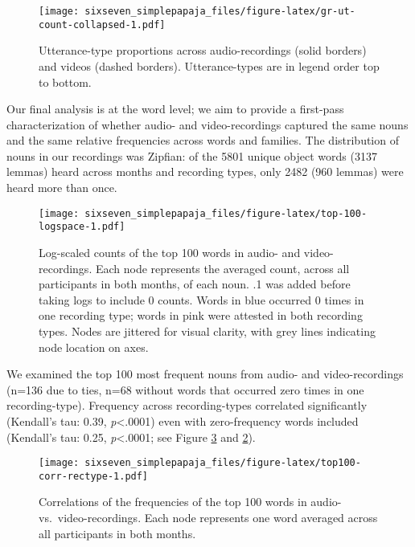 \documentclass[floatsintext,man]{apa6}
\theoremstyle{definition}
\theoremstyle{definition}
\theoremstyle{definition}
\theoremstyle{remark}
\begin{document}
\begin{figure}
\centering
\texttt{[image: sixseven\_simplepapaja\_files/figure-latex/gr-ut-count-collapsed-1.pdf]}
\caption{\label{fig:gr-ut-count-collapsed}Utterance-type proportions across
audio-recordings (solid borders) and videos (dashed borders).
Utterance-types are in legend order top to bottom.}
\end{figure}

Our final analysis is at the word level; we aim to provide a first-pass
characterization of whether audio- and video-recordings captured the
same nouns and the same relative frequencies across words and families.
The distribution of nouns in our recordings was Zipfian: of the 5801
unique object words (3137 lemmas) heard across months and recording
types, only 2482 (960 lemmas) were heard more than once.

\begin{figure}
\centering
\texttt{[image: sixseven\_simplepapaja\_files/figure-latex/top-100-logspace-1.pdf]}
\caption{\label{fig:top-100-logspace}Log-scaled counts of the top 100 words
in audio- and video-recordings. Each node represents the averaged count,
across all participants in both months, of each noun. .1 was added
before taking logs to include 0 counts. Words in blue occurred 0 times
in one recording type; words in pink were attested in both recording
types. Nodes are jittered for visual clarity, with grey lines indicating
node location on axes.}
\end{figure}

We examined the top 100 most frequent nouns from audio- and
video-recordings (n=136 due to ties, n=68 without words that occurred
zero times in one recording-type). Frequency across recording-types
correlated significantly (Kendall's tau: 0.39, \emph{p}\textless{}.0001)
even with zero-frequency words included (Kendall's tau: 0.25,
\emph{p}\textless{}.0001; see Figure \ref{fig:top100-corr-rectype} and
\ref{fig:top-100-logspace}).

\begin{figure}
\centering
\texttt{[image: sixseven\_simplepapaja\_files/figure-latex/top100-corr-rectype-1.pdf]}
\caption{\label{fig:top100-corr-rectype}Correlations of the frequencies of
the top 100 words in audio- vs.~video-recordings. Each node represents
one word averaged across all participants in both months.}
\end{figure}
\end{document}
